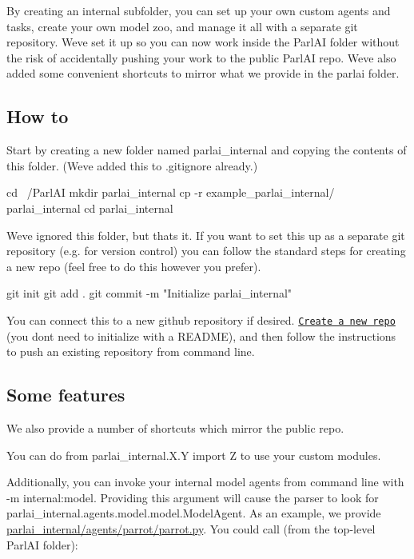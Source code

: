 By creating an internal subfolder, you can set up your own custom agents and tasks, create your own model zoo, and manage it all with a separate git repository. We\textquotesingle{}ve set it up so you can now work inside the Parl\+AI folder without the risk of accidentally pushing your work to the public Parl\+AI repo. We\textquotesingle{}ve also added some convenient shortcuts to mirror what we provide in the {\ttfamily parlai} folder.

\subsection*{How to}

Start by creating a new folder named parlai\+\_\+internal and copying the contents of this folder. (We\textquotesingle{}ve added this to .gitignore already.)


\begin{DoxyCode}
cd ~/ParlAI
mkdir parlai\_internal
cp -r example\_parlai\_internal/ parlai\_internal
cd parlai\_internal
\end{DoxyCode}


We\textquotesingle{}ve ignored this folder, but that\textquotesingle{}s it. If you want to set this up as a separate git repository (e.\+g. for version control) you can follow the standard steps for creating a new repo (feel free to do this however you prefer).


\begin{DoxyCode}
git init
git add .
git commit -m "Initialize parlai\_internal"
\end{DoxyCode}


You can connect this to a new github repository if desired. \href{https://github.com/new}{\tt Create a new repo} (you don\textquotesingle{}t need to initialize with a R\+E\+A\+D\+ME), and then follow the instructions to push an existing repository from command line.

\subsection*{Some features}

We also provide a number of shortcuts which mirror the public repo.

You can do {\ttfamily from parlai\+\_\+internal.\+X.\+Y import Z} to use your custom modules.

Additionally, you can invoke your internal model agents from command line with {\ttfamily -\/m internal\+:model}. Providing this argument will cause the parser to look for {\ttfamily parlai\+\_\+internal.\+agents.\+model.\+model.\+Model\+Agent}. As an example, we provide {\ttfamily \hyperlink{parrot_8py}{parlai\+\_\+internal/agents/parrot/parrot.\+py}}. You could call (from the top-\/level Parl\+AI folder)\+:


